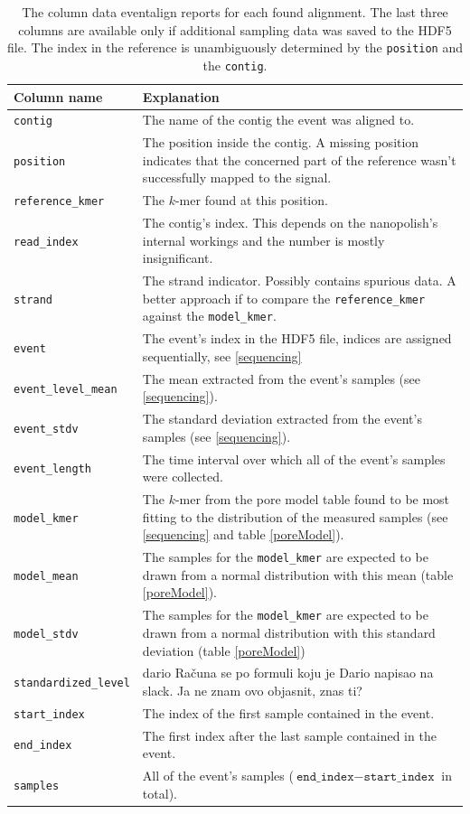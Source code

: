 \documentclass[times, utf, seminar]{fer}
\begin{document}
\begin{table}
	\centering
	\begin{tabular}{l|p{10cm}}
		Column name & Explanation\\
		\hline
	\texttt{contig} & The name of the contig the event was aligned to. \\
	\texttt{position} & The position inside the contig. A missing position indicates that the concerned part of the reference wasn't successfully mapped to the signal. \\
	\texttt{reference\_kmer} & The $k$-mer found at this position. \\       
	\texttt{read\_index} & The contig's index. This depends on the nanopolish's internal workings and the number is mostly insignificant. \\
	\texttt{strand}  & The strand indicator. Possibly contains spurious data. A better approach if to compare the \texttt{reference\_kmer} against the \texttt{model\_kmer}. \\
	\texttt{event} &  The event's index in the HDF5 file, indices are assigned sequentially, see \ref{sequencing}\\
	\texttt{event\_level\_mean} & The mean extracted from the event's samples (see \ref{sequencing}). \\
	\texttt{event\_stdv} & The standard deviation extracted from the event's samples (see \ref{sequencing}). \\
	\texttt{event\_length} & The time interval over which all of the event's samples were collected. \\
	\texttt{model\_kmer} & The $k$-mer from the pore model table found to be most fitting to the distribution of the measured samples (see \ref{sequencing} and table \ref{poreModel}). \\
	\texttt{model\_mean} & The samples for the \texttt{model\_kmer} are expected to be drawn from a normal distribution with this mean (table \ref{poreModel}). \\
	\texttt{model\_stdv} & The samples for the \texttt{model\_kmer} are expected to be drawn from a normal distribution with this standard deviation (table \ref{poreModel}) \\
	\texttt{standardized\_level} & dario Računa se po formuli koju je Dario napisao na slack. Ja ne znam ovo objasnit, znas ti? \\
	\texttt{start\_index} & The index of the first sample contained in the event. \\               
	\texttt{end\_index} & The first index after the last sample contained in the event. \\
	\texttt{samples} & All of the event's samples ($\texttt{end\_index} - \texttt{start\_index}$ in total).     
	\end{tabular}
	\caption{The column data eventalign reports for each found alignment. The last three columns are available only if additional sampling data was saved to the HDF5 file. The index in the reference is unambiguously determined by the \texttt{position} and the \texttt{contig}.}
	\label{nanopolishOutput}
\end{table}
\end{document}
